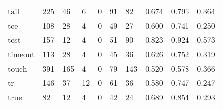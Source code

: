 \begin{longtable}{lp{1.3cm}p{1.3cm}p{1.3cm}p{1.3cm}p{1.3cm}p{1.3cm}p{1.3cm}p{1.3cm}p{1.3cm}}
tail      &                    225 &                                 46 &                                 6 &                                0 &                                91 &                              82 &                                0.674 &                                  0.796 &                                0.364 \\
tee       &                    108 &                                 28 &                                 4 &                                0 &                                49 &                              27 &                                0.600 &                                  0.741 &                                0.250 \\
test      &                    157 &                                 12 &                                 4 &                                0 &                                51 &                              90 &                                0.823 &                                  0.924 &                                0.573 \\
timeout   &                    113 &                                 28 &                                 4 &                                0 &                                45 &                              36 &                                0.626 &                                  0.752 &                                0.319 \\
touch     &                    391 &                                165 &                                 4 &                                0 &                                79 &                             143 &                                0.520 &                                  0.578 &                                0.366 \\
tr        &                    146 &                                 37 &                                12 &                                0 &                                61 &                              36 &                                0.580 &                                  0.747 &                                0.247 \\
true      &                     82 &                                 12 &                                 4 &                                0 &                                42 &                              24 &                                0.689 &                                  0.854 &                                0.293 \\

\end{longtable}
